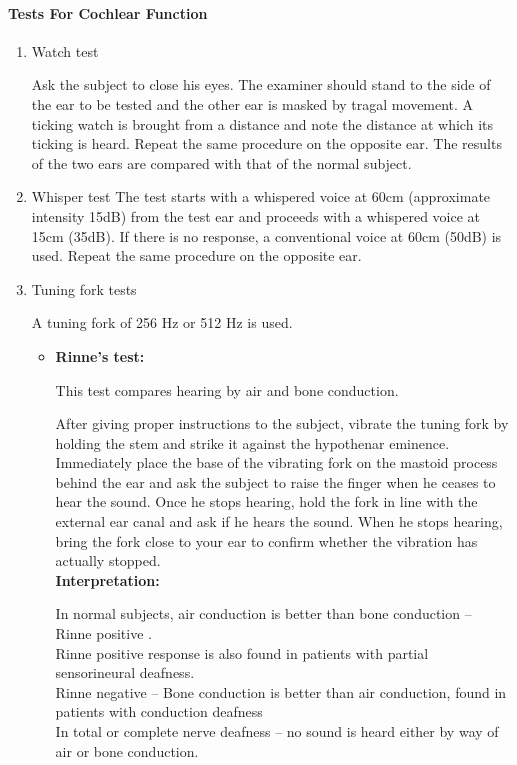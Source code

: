 \documentclass[a4paper,12pt,openany,twoside]{book}
\begin{document}
		\paragraph{Tests For Cochlear Function}
		\begin{enumerate}
\item{Watch test
	\par
	Ask the subject to close his eyes. The examiner should stand to the side of the ear to be tested and the other ear is masked by tragal movement. A ticking watch is brought from a distance and note the distance at which its ticking is heard. Repeat the same procedure on the opposite ear. The results of the two ears are compared with that of the normal subject.}
\item{Whisper test
	The test starts with a whispered voice at 60cm (approximate intensity 15dB) from the test ear and proceeds with a whispered voice at 15cm (35dB). If there is no response, a conventional voice at 60cm (50dB) is used. Repeat the same procedure on the opposite ear.}
\item{Tuning fork tests
	\par
A tuning fork of 256 Hz or 512 Hz is used.
	}
	
				\begin{itemize}
						\renewcommand{\labelitemi}{$\diamond$}

					\item{\textbf{Rinne’s test:}
\par
This test compares hearing by air and bone conduction.
\par
After giving proper instructions to the subject, vibrate the tuning fork by holding the stem and strike it against the hypothenar eminence.
Immediately place the base of the vibrating fork on the mastoid process behind the ear and ask the subject to raise the finger when he ceases to hear the sound.
Once he stops hearing, hold the fork in line with the external ear canal and ask if he hears the sound. When he stops hearing, bring the fork close to your ear to confirm whether the vibration has actually stopped.\\

						\textbf{Interpretation:}
						\par
In normal subjects, air conduction is better than bone conduction – Rinne positive .\\
Rinne positive response is also found in patients with partial sensorineural deafness.\\
Rinne negative – Bone conduction is better than air conduction, found in patients with conduction deafness\\
In total or complete nerve deafness – no sound is heard either by way of air or bone conduction.

}
\end{itemize}
\end{enumerate}
\end{document}
